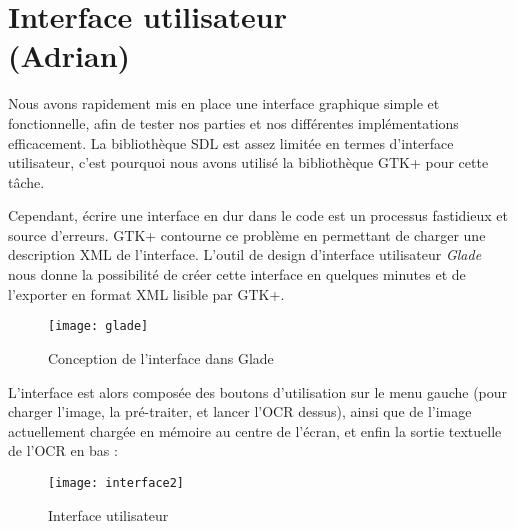 \chapter{Interface utilisateur\\ (Adrian)}

Nous avons rapidement mis en place une interface graphique simple et
fonctionnelle, afin de tester nos parties et nos différentes implémentations
efficacement. La bibliothèque SDL est assez limitée en termes d'interface
utilisateur, c'est pourquoi nous avons utilisé la bibliothèque GTK+ pour cette
tâche.

Cependant, écrire une interface en dur dans le code est un processus fastidieux
et source d'erreurs. GTK+ contourne ce problème en permettant de charger une
description XML de l'interface. L'outil de design d'interface utilisateur
\textit{Glade} nous donne la possibilité de créer cette interface en quelques
minutes et de l'exporter en format XML lisible par GTK+.

\begin{figure}[H]
    \centering
    \texttt{[image: glade]}
    \caption{Conception de l'interface dans Glade}
\end{figure}

L'interface est alors composée des boutons d'utilisation sur le menu gauche
(pour charger l'image, la pré-traiter, et lancer l'OCR dessus), ainsi que de
l'image actuellement chargée en mémoire au centre de l'écran, et enfin la sortie
textuelle de l'OCR en bas :

\begin{figure}[H]
    \centering
    \texttt{[image: interface2]}
    \caption{Interface utilisateur}
\end{figure}
